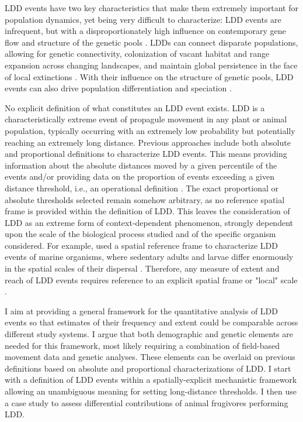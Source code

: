 \documentclass[a4paper, 12pt]{article}
\begin{document}
\begin{linenumbers}
LDD events have two key characteristics that make them extremely important for population dynamics, yet being very difficult to characterize: LDD events are infrequent, but with a disproportionately high influence on contemporary gene flow and structure of the genetic pools \citep[e.g., ][]{Schurr2009long,Clobert:2012vw,Travis:2013en}. LDDs can connect disparate populations, allowing for genetic connectivity, colonization of vacant habitat and range expansion across changing landscapes, and maintain global persistence in the face of local extinctions \citep{Trakhtenbrot:2005ij,Baguette:2006aa,Ronce:2007hc,Schloss:2012gt}. With their influence on the structure of genetic pools, LDD events can also drive population differentiation and speciation \citep{Garant:2007cka,Ronce:2007hc}.

No explicit definition of what constitutes an LDD event exists. LDD is a characteristically extreme event of propagule movement in any plant or animal population, typically occurring with an extremely low probability but potentially reaching an extremely long distance. Previous approaches \citep[e.g., ][]{Nathan:2006aa,Schurr2009long} include both absolute and proportional definitions to characterize LDD events. This means providing information about the absolute distances moved by a given percentile of the events and/or providing data on the proportion of events exceeding a given distance threshold, i.e., an operational definition \citep{Nathan:2008is}. The exact proportional or absolute thresholds selected remain somehow arbitrary, as no reference spatial frame is provided within the definition of LDD. This leaves the consideration of LDD as an extreme form of context-dependent phenomenon, strongly dependent upon the scale of the biological process studied \citep{Kinlan:2005fb} and of the specific organism considered. For example, \cite{Kinlan:2005fb} used a spatial reference frame to characterize LDD events of marine organisms, where sedentary adults and larvae differ enormously in the spatial scales of their dispersal \citep{DAloia:2013fc}. Therefore, any measure of extent and reach of LDD events requires reference to an explicit spatial frame or "local" scale \citep{Kinlan:2005fb,Byrne:2014gu}.

I aim at providing a general framework for the quantitative analysis of LDD events so that estimates of their frequency and extent could be comparable across different study systems. I argue that both demographic and genetic elements are needed for this framework, most likely requiring a combination of field-based movement data and genetic analyses. These elements can be overlaid on previous definitions based on absolute and proportional characterizations of LDD. I start with a definition of LDD events within a spatially-explicit mechanistic framework allowing an unambiguous meaning for setting long-distance thresholds. I then use a case study to assess differential contributions of animal frugivores performing LDD.


\end{linenumbers}
\end{document}
